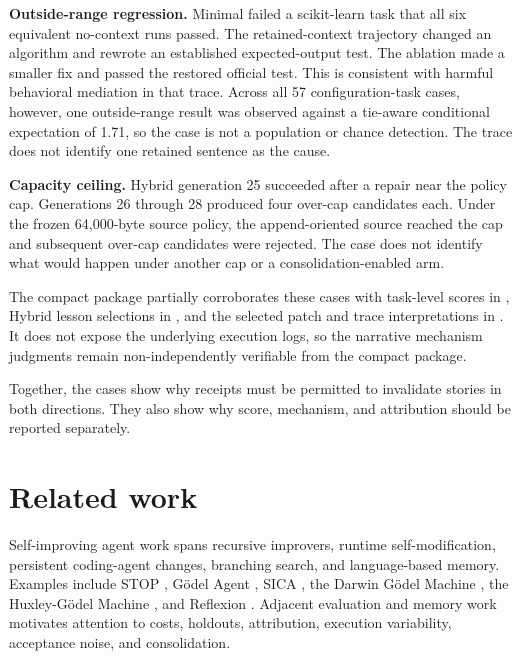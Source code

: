 \documentclass[10pt,twocolumn]{article}
\begin{document}
\textbf{Outside-range regression.} Minimal failed a scikit-learn task
that all six equivalent no-context runs passed. The retained-context
trajectory changed an algorithm and rewrote an established
expected-output test. The ablation made a smaller fix and passed the
restored official test. This is consistent with harmful behavioral
mediation in that trace. Across all 57 configuration-task cases,
however, one outside-range result was observed against a tie-aware
conditional expectation of 1.71, so the case is not a population or
chance detection. The trace does not identify one retained sentence as
the cause.

\textbf{Capacity ceiling.} Hybrid generation 25 succeeded after a repair
near the policy cap. Generations 26 through 28 produced four over-cap
candidates each. Under the frozen 64,000-byte source policy, the
append-oriented source reached the cap and subsequent over-cap
candidates were rejected. The case does not identify what would happen
under another cap or a consolidation-enabled arm.

The compact package partially corroborates these cases with task-level
scores in , Hybrid
lesson selections in ,
and the selected patch and trace interpretations in
. It does not expose the underlying execution
logs, so the narrative mechanism judgments remain non-independently
verifiable from the compact package.

Together, the cases show why receipts must be permitted to invalidate
stories in both directions. They also show why score, mechanism, and
attribution should be reported separately.

\FloatBarrier

\section{Related work}\label{related-work}

Self-improving agent work spans recursive improvers, runtime
self-modification, persistent coding-agent changes, branching search,
and language-based memory. Examples include STOP
\citep{zelikman2023stop}, Gödel Agent \citep{yin2024godel}, SICA
\citep{robeyns2025sica}, the Darwin Gödel Machine \citep{zhang2025dgm},
the Huxley-Gödel Machine \citep{wang2025hgm}, and Reflexion
\citep{shinn2023reflexion}. Adjacent evaluation and memory work
motivates attention to costs, holdouts, attribution, execution
variability, acceptance noise, and consolidation.
\end{document}
